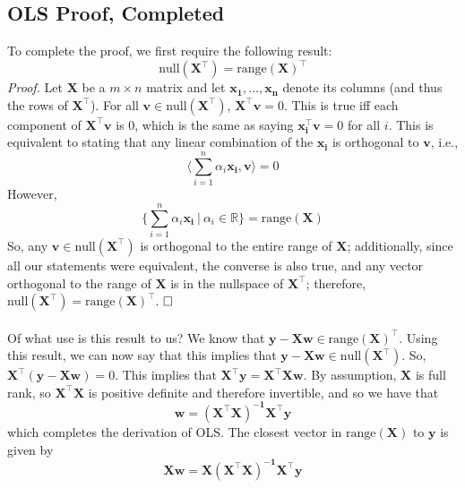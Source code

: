 \documentclass{article}
\begin{document}
\subsection*{OLS Proof, Completed}
To complete the proof, we first require the following result:
$$ \text{null}(\mathbf{X}^{\top}) = \text{range}(\mathbf{X})^{\top}$$
\textit{Proof.} Let $\mathbf{X}$ be a $m \times n$ matrix and let $\mathbf{x_1, \ldots, x_n}$ denote its columns (and thus the rows of $\mathbf{X^{\top}}$). For all $\mathbf{v} \in \text{null}(\mathbf{X^{\top}})$, $\mathbf{X^{\top}v} = 0$. This is true iff each component of $\mathbf{X^{\top}v}$ is 0, which is the same as saying $\mathbf{x_i^{\top}v} = 0$ for all $i$. This is equivalent to stating that any linear combination of the $\mathbf{x_i}$ is orthogonal to $\mathbf{v}$, i.e., $$\langle \sum\limits_{i=1}^n \alpha_i\mathbf{x_i}, \mathbf{v} \rangle = 0$$ However, $$\{\sum\limits_{i=1}^n \alpha_i\mathbf{x_i}\ |\ \alpha_i \in \mathbb{R}\} = \text{range}(\mathbf{X})$$ So, any $\mathbf{v} \in \text{null}(\mathbf{X^{\top}})$ is orthogonal to the entire range of $\mathbf{X}$; additionally, since all our statements were equivalent, the converse is also true, and any vector orthogonal to the range of $\mathbf{X}$ is in the nullspace of $\mathbf{X^{\top}}$; therefore, 
$\text{null}(\mathbf{X}^{\top}) = \text{range}(\mathbf{X})^{\top}$. $\hfill\square$\\\\
Of what use is this result to us? We know that $\mathbf{y - Xw} \in \text{range}(\mathbf{X})^{\top}$. Using this result, we can now say that this implies that $\mathbf{y - Xw} \in \text{null}(\mathbf{X^{\top}})$. So, $\mathbf{X^{\top}(y - Xw)} = 0$. This implies that $\mathbf{X^{\top}y} = \mathbf{X^{\top}Xw}$. By assumption, $\mathbf{X}$ is full rank, so $\mathbf{X^{\top}X}$ is positive definite and therefore invertible, and so we have that $$\mathbf{w} = \mathbf{(X^{\top}X)^{-1}X^{\top}y}$$ which completes the derivation of OLS. The closest vector in $\text{range}(\mathbf{X})$ to $\mathbf{y}$ is given by $$\mathbf{Xw} = \mathbf{X(X^{\top}X)^{-1}X^{\top}y}$$
\end{document}
